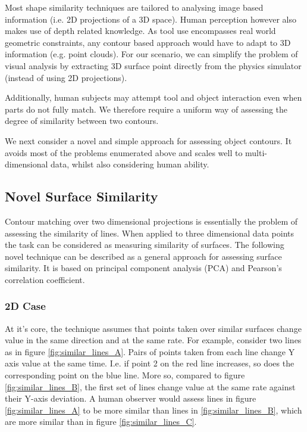 \documentclass[
    floatsintext
]{article}
\begin{document}
Most shape similarity techniques are tailored to analysing image based information (i.e. 2D projections of a 3D space).
Human perception however also makes use of depth related knowledge.
As tool use encompasses real world geometric constraints, any contour based approach would have to adapt to 3D information (e.g. point clouds).
For our scenario, we can simplify the problem of visual analysis by extracting 3D surface point directly from the physics simulator (instead of using 2D projections). 

Additionally, human subjects may attempt tool and object interaction even when parts do not fully match. 
We therefore require a uniform way of assessing the degree of similarity between two contours. 

We next consider a novel and simple approach for assessing object contours.
It avoids most of the problems enumerated above and scales well to multi-dimensional data, whilst also considering human ability.  

\pagebreak[0]
\subsection{Novel Surface Similarity}
Contour matching over two dimensional projections is essentially the problem of assessing the similarity of lines.  
When applied to three dimensional data points the task can be considered as measuring similarity of surfaces.  
The following novel technique can be described as a general approach for assessing surface similarity. 
It is based on principal component analysis (PCA) and Pearson's correlation coefficient. 

\subsubsection{2D Case}
At it's core, the technique assumes that points taken over similar surfaces change value in the same direction and at the same rate. 
For example, consider two lines as in figure \ref{fig:similar_lines_A}. Pairs of points taken from each line change Y axis value at the same time. 
I.e. if point 2 on the red line increases, so does the corresponding point on the blue line.   
More so, compared to figure \ref{fig:similar_lines_B}, the first set of lines change value at the same rate against their Y-axis deviation.
A human observer would assess lines in figure \ref{fig:similar_lines_A} to be more similar than lines in \ref{fig:similar_lines_B},
which are more similar than in figure \ref{fig:similar_lines_C}.
\end{document}
